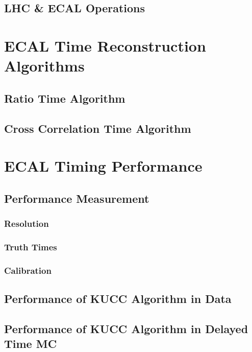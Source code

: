 \documentclass{cmspaper}
\begin{document}
\subsection{LHC \& ECAL Operations \label{sec:reco4}}

\FloatBarrier

\section{ECAL Time Reconstruction Algorithms \label{sec:algo}}
\subsection{Ratio Time Algorithm \label{sec:algo1}}

\FloatBarrier
\subsection{Cross Correlation Time Algorithm \label{sec:algo2}}

\FloatBarrier

\section{ECAL Timing Performance \label{sec:res}}
\subsection{Performance Measurement \label{sec:resmeth}}
\subsubsection{Resolution \label{sec:resmeth1}}

\FloatBarrier
\subsubsection{Truth Times \label{sec:resmeth2}}

\FloatBarrier
\subsubsection{Calibration \label{sec:resmeth3}}

\FloatBarrier
\subsection{Performance of KUCC Algorithm in Data \label{sec:resdata}}

\FloatBarrier
\subsection{Performance of KUCC Algorithm in Delayed Time MC \label{sec:reslldata}}

\FloatBarrier
\end{document}
